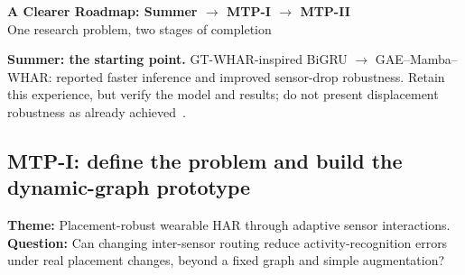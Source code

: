 \documentclass[10pt]{article}
\begin{document}
\newpage
\begin{center}
{\large\bfseries A Clearer Roadmap: Summer $\rightarrow$ MTP-I $\rightarrow$ MTP-II}\\[3pt]
{\small One research problem, two stages of completion}
\end{center}

\textbf{Summer: the starting point.} GT-WHAR-inspired BiGRU $\rightarrow$ GAE--Mamba--WHAR: reported faster inference and improved sensor-drop robustness. Retain this experience, but verify the model and results; do not present displacement robustness as already achieved~\cite{report}.

\subsection*{MTP-I: define the problem and build the dynamic-graph prototype}
\textbf{Theme:} Placement-robust wearable HAR through adaptive sensor interactions.\\
\textbf{Question:} Can changing inter-sensor routing reduce activity-recognition errors under real placement changes, beyond a fixed graph and simple augmentation?
\end{document}
